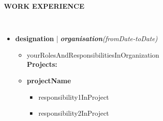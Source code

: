\documentclass[a4paper,10pt]{article}
\newcommand{\resheading}[1]{{\small \colorbox{mygrey}{\begin{minipage}{0.99\textwidth}{\textbf{#1 \vphantom{p\^{E}}}}\end{minipage}}}}
\begin{document}
\noindent
\resheading{\textbf{WORK EXPERIENCE}}\\[-0.3cm]
\begin{itemize}[noitemsep,nolistsep]
    \item \textbf{designation} | \textbf{\emph{organisation}}\hfill \emph{(fromDate-toDate)}\\[-0.6cm]
    \begin{itemize}[noitemsep]
        \item yourRolesAndResponsibilitiesInOrganization\\
        \textbf{Projects:}
        \item \textbf{projectName}  
\begin{itemize}[noitemsep,nolistsep]
    \item responsibility1InProject
    \item responsibility2InProject
\end{itemize}

\end{itemize}
\end{itemize}
\end{document}
